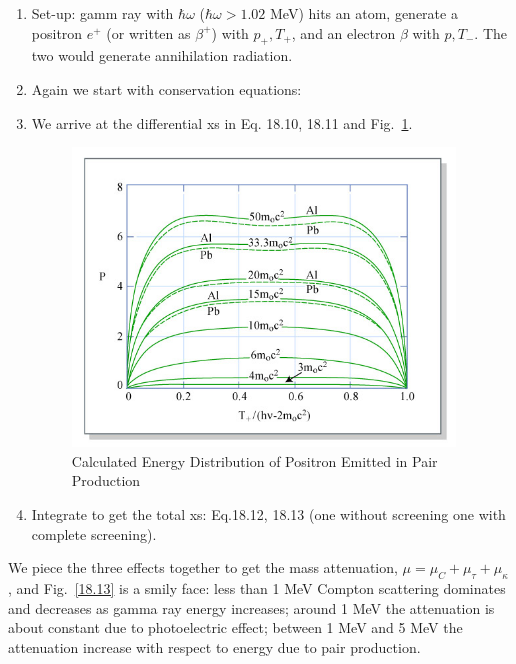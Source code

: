 \documentclass{school-22.101-notes}
\begin{document}
\begin{enumerate}
\item Set-up: gamm ray with $\hbar \omega$ ($\hbar \omega > 1.02$ MeV) hits an atom, generate a positron $e^+$ (or written as $\beta^+$) with $p_+, T_+$, and an electron $\beta$ with $p, T_-$. The two would generate annihilation radiation. 

\item Again we start with conservation equations: 

\item We arrive at the differential xs in Eq. 18.10, 18.11 and Fig.~\ref{18.8}. 
  \begin{figure}[ht]
    \centering
    \includegraphics[width=4in]{images/ni/18.8.png}
    \caption{Calculated Energy Distribution of Positron Emitted in Pair Production} \label{18.8} 
  \end{figure}

\item Integrate to get the total xs: Eq.18.12, 18.13 (one without screening one with complete screening). 

\end{enumerate}




We piece the three effects together to get the mass attenuation, $\mu = \mu_C + \mu_{\tau} + \mu_{\kappa}$, and 
Fig.~\ref{18.13} is a smily face: less than 1 MeV Compton scattering dominates and decreases as gamma ray energy increases; around 1 MeV the attenuation is about constant due to photoelectric effect; between 1 MeV and 5 MeV the attenuation increase with respect to energy due to pair production. 
\end{document}
